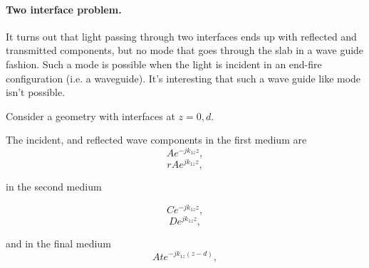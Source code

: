 %
%

\renewcommand{\basename}{emt10}
\renewcommand{\dirname}{notes/ece1228/}
\newcommand{\keywords}{ECE1228H}


\usepackage{peeters_braket}
\usepackage{peeters_figures}
\usepackage{mathtools}
\usepackage{siunitx}
\usepackage{macros_bm}

\beginArtNoToc
{}
\label{chap:emt10}

\paragraph{Two interface problem.}

It turns out that light passing through two interfaces ends up with reflected and transmitted components, but no mode that goes through the slab in a wave guide fashion.  Such a mode is possible when the light is incident in an end-fire configuration (i.e. a waveguide).  It's interesting that such a wave guide like mode isn't possible.

Consider a geometry with interfaces at \( z = 0, d \).  

The incident, and reflected wave components in the first medium are
\begin{dmath}\label{eqn:emtLecture10:140}
   A e^{-j k_{1z} z},
\end{dmath}
\begin{dmath}\label{eqn:emtLecture10:160}
   r A e^{j k_{1z} z},
\end{dmath}

in the second medium 

\begin{dmath}\label{eqn:emtLecture10:180}
   C e^{-j k_{1z} z},
\end{dmath}
\begin{dmath}\label{eqn:emtLecture10:200}
   D e^{j k_{1z} z},
\end{dmath}

and in the final medium
\begin{dmath}\label{eqn:emtLecture10:220}
   A t e^{-j k_{1z} (z-d)},
\end{dmath}

